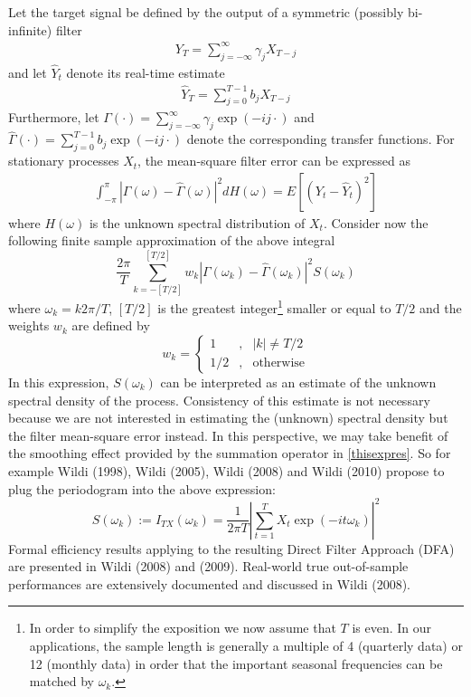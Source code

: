 \documentclass[11pt]{article}
\begin{document}
Let the target signal be defined by the output of a symmetric (possibly bi-infinite) filter
\begin{eqnarray}\label{target}
Y_T=\sum_{j=-\infty}^\infty \gamma_{j}X_{T-j}
\end{eqnarray}
and let $\hat{Y}_t$ denote its real-time estimate
\begin{eqnarray}\label{targetrt}
\hat{Y}_T=\sum_{j=0}^{T-1} b_{j}X_{T-j}
\end{eqnarray}
Furthermore, let $\Gamma(\cdot)=\sum_{j=-\infty}^\infty \gamma_{j}\exp(-ij\cdot)$ and
$\hat{\Gamma}(\cdot)=\sum_{j=0}^{T-1} b_{j}\exp(-ij\cdot)$ denote the corresponding transfer functions. For stationary processes $X_t$, the
mean-square filter error can be expressed as
\begin{eqnarray}\label{specdect}
\int_{-\pi}^\pi |\Gamma(\omega)-\hat{\Gamma}(\omega)|^2
dH(\omega)=E[(Y_t-\hat{Y}_t)^2]
\end{eqnarray}
where $H(\omega)$ is the unknown spectral distribution of $X_t$. Consider now the following finite sample approximation of the above integral
\begin{equation}\label{thisexpres}
\frac{2\pi}{T} \sum_{k=-[T/2]}^{[T/2]}
w_k|\Gamma(\omega_k)-\hat{\Gamma}(\omega_k)|^2 S(\omega_k)
\end{equation}
where $\omega_k=k2\pi/T$, \([T/2]\) is the greatest
integer\footnote{\label{ruzit}In order to simplify the exposition we
now assume that $T$ is even. In our applications, the sample length
is generally a multiple of 4 (quarterly data) or 12 (monthly data)
in order that the important seasonal frequencies can be matched by
$\omega_k$.} smaller or equal to \(T/2\) and the weights $w_k$ are
defined by
\begin{equation}\label{wk}
w_k=\left\{\begin{array}{ccc}1&,&|k|\not= T/2\\
1/2&,&\textrm{otherwise}\end{array}\right.
\end{equation}
In this expression, $S(\omega_k)$ can be interpreted as an estimate of the unknown spectral density of the process. Consistency of this estimate is not necessary because we are not interested in estimating the (unknown) spectral density but the filter mean-square error instead. In this perspective, we may take benefit of the smoothing effect provided by the summation operator in \ref{thisexpres}. So for example Wildi (1998), Wildi (2005), Wildi (2008) and Wildi (2010) propose to plug the periodogram into the above expression:
\[S(\omega_k):=I_{TX}(\omega_k)=\frac{1}{2\pi
T}\left| \sum_{t=1}^TX_t\exp(-it\omega_k)\right|^2
\]
Formal efficiency results applying to the resulting Direct Filter Approach (DFA) are presented in Wildi (2008) and (2009). Real-world true out-of-sample performances are extensively documented and discussed in Wildi (2008). \\
\end{document}
